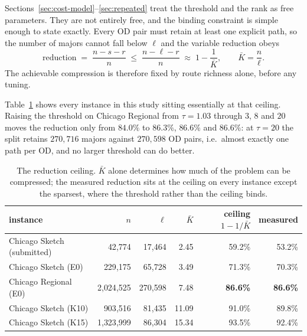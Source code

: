 \documentclass[11pt]{article}
\begin{document}
Sections~\ref{sec:cost-model}--\ref{sec:repeated} treat the threshold and the rank as free
parameters. They are not entirely free, and the binding constraint is simple enough to state
exactly. Every OD pair must retain at least one explicit path, so the number of majors cannot
fall below $\ell$ and the variable reduction obeys
\begin{equation}
\label{eq:ceiling}
\text{reduction}\;=\;\frac{n-s-r}{n}\;\le\;\frac{n-\ell-r}{n}\;\approx\;1-\frac{1}{\bar K},
\qquad \bar K=\frac{n}{\ell}.
\end{equation}
The achievable compression is therefore fixed by route richness alone, before any tuning.

Table~\ref{tab:ceiling} shows every instance in this study sitting essentially at that
ceiling. Raising the threshold on Chicago Regional from $\tau=1.03$ through $3$, $8$ and $20$
moves the reduction only from $84.0\%$ to $86.3\%$, $86.6\%$ and $86.6\%$: at $\tau=20$ the
split retains $270{,}716$ majors against $270{,}598$ OD pairs, i.e.\ almost exactly one path
per OD, and no larger threshold can do better.

\begin{table}[h]
\centering
\caption{The reduction ceiling. $\bar K$ alone determines how much of the problem can be
compressed; the measured reduction sits at the ceiling on every instance except the sparsest,
where the threshold rather than the ceiling binds.}
\label{tab:ceiling}
{\small
\begin{tabular}{lrrrrr}
\toprule
instance & $n$ & $\ell$ & $\bar K$ & ceiling $1-1/\bar K$ & measured\\
\midrule
Chicago Sketch (submitted) & 42{,}774    & 17{,}464 & 2.45  & 59.2\% & 53.2\%\\
Chicago Sketch (E0)        & 229{,}175   & 65{,}728 & 3.49  & 71.3\% & 70.3\%\\
Chicago Regional (E0)      & 2{,}024{,}525 & 270{,}598 & 7.48 & \textbf{86.6\%} & \textbf{86.6\%}\\
Chicago Sketch (K10)       & 903{,}516   & 81{,}435 & 11.09 & 91.0\% & 89.8\%\\
Chicago Sketch (K15)       & 1{,}323{,}999 & 86{,}304 & 15.34 & 93.5\% & 92.4\%\\
\bottomrule
\end{tabular}}
\end{table}
\end{document}
